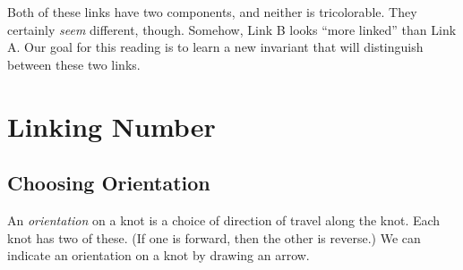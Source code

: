 \documentclass[12pt,letterpaper]{article}
\theoremstyle{definition}
\begin{document}
Both of these links have two components, and neither is tricolorable.
They certainly \emph{seem} different, though.
Somehow, Link B looks ``more linked'' than Link A.
Our goal for this reading is to learn a new invariant that will distinguish between these two links.

\section*{Linking Number}

\subsection*{Choosing Orientation}

An \emph{orientation} on a knot is a choice of direction of travel along the knot.
Each knot has two of these. 
(If one is forward, then the other is reverse.)
We can indicate an orientation on a knot by drawing an arrow.
\end{document}
